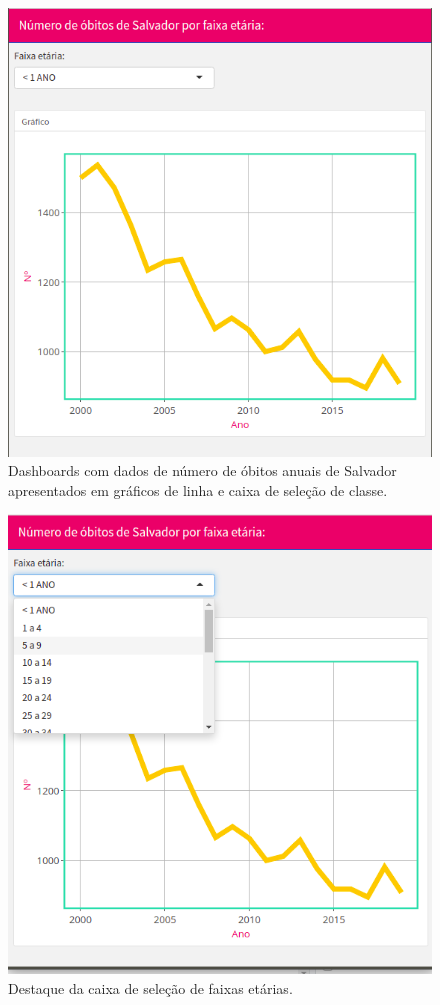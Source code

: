 \documentclass[
]{book}
\begin{document}
\begin{figure}
\includegraphics[width=7.93in]{images/image65} \caption{ Dashboards  com dados de número de óbitos anuais de Salvador apresentados em gráficos de linha e caixa de seleção de classe.}\label{fig:dashm1cossa}
\end{figure}

\begin{figure}
\includegraphics[width=7.88in]{images/image6} \caption{Destaque da caixa de seleção de faixas etárias.}\label{fig:dashm2cossa}
\end{figure}
\end{document}

